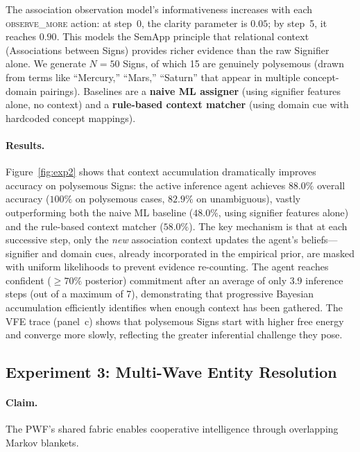 \documentclass[11pt,a4paper]{article}
\theoremstyle{definition}
\begin{document}
The association observation model's informativeness increases with each \textsc{observe\_more} action: at step~0, the clarity parameter is $0.05$; by step~5, it reaches $0.90$. This models the SemApp principle that relational context (Associations between Signs) provides richer evidence than the raw Signifier alone. We generate $N = 50$ Signs, of which 15 are genuinely polysemous (drawn from terms like ``Mercury,'' ``Mars,'' ``Saturn'' that appear in multiple concept-domain pairings). Baselines are a \textbf{naive ML assigner} (using signifier features alone, no context) and a \textbf{rule-based context matcher} (using domain cue with hardcoded concept mappings).

\paragraph{Results.} Figure~\ref{fig:exp2} shows that context accumulation dramatically improves accuracy on polysemous Signs: the active inference agent achieves $88.0\%$ overall accuracy ($100\%$ on polysemous cases, $82.9\%$ on unambiguous), vastly outperforming both the naive ML baseline ($48.0\%$, using signifier features alone) and the rule-based context matcher ($58.0\%$). The key mechanism is that at each successive step, only the \emph{new} association context updates the agent's beliefs---signifier and domain cues, already incorporated in the empirical prior, are masked with uniform likelihoods to prevent evidence re-counting. The agent reaches confident ($\geq 70\%$ posterior) commitment after an average of only 3.9 inference steps (out of a maximum of 7), demonstrating that progressive Bayesian accumulation efficiently identifies when enough context has been gathered. The VFE trace (panel~c) shows that polysemous Signs start with higher free energy and converge more slowly, reflecting the greater inferential challenge they pose.

\subsection{Experiment 3: Multi-Wave Entity Resolution}
\label{sec:exp3}

\paragraph{Claim.} The PWF's shared fabric enables cooperative intelligence through overlapping Markov blankets.
\end{document}
